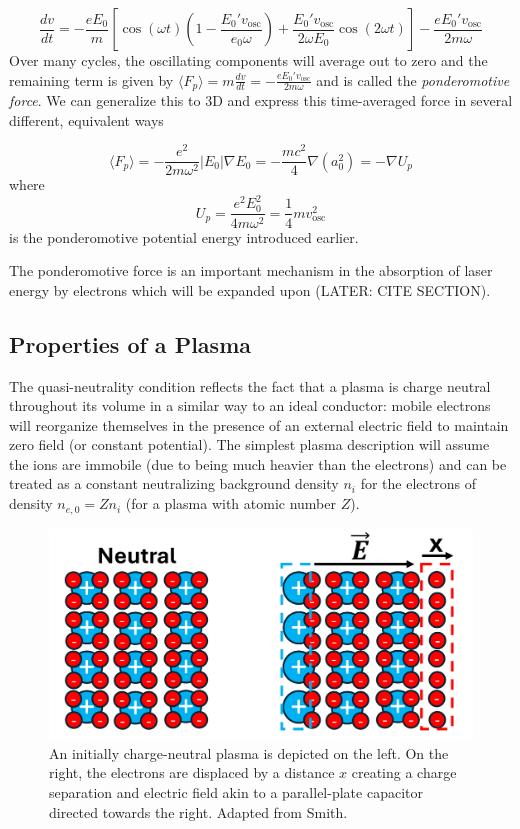 \begin{equation}
	\frac{d v}{d t} = - \frac{e E_0}{m} [\cos(\omega t)(1 - \frac{E_0' v_\text{osc}}{e_0 \omega}) + \frac{E_0' v_\text{osc}}{2 \omega E_0} \cos(2 \omega t)] - \frac{e E_0' v_\text{osc}}{2 m \omega}
\end{equation}
Over many cycles, the oscillating components will average out to zero and the remaining term is given by $\langle F_p \rangle = m \frac{d v}{d t} = - \frac{e E_0' v_\text{osc}}{2 m \omega}$ and is called the \emph{ponderomotive force}. We can generalize this to 3D and express this time-averaged force in several different, equivalent ways

\begin{equation}
	\langle F_p \rangle = - \frac{e^2}{2 m \omega^2} \lvert E_0 \rvert \nabla E_0 = - \frac{m c^2}{4} \nabla(a_0^2) = - \nabla U_p \label{eq:pond_force}
\end{equation}
where 
\begin{equation}
	U_p = \frac{e^2 E_0^2}{4 m \omega^2} = \frac{1}{4} m v_\text{osc}^2 \label{eq:pond_potential}
\end{equation}
is the ponderomotive potential energy introduced earlier. 

The ponderomotive force is an important mechanism in the absorption of laser energy by electrons which will be expanded upon (LATER: CITE SECTION).

\subsection{Properties of a Plasma}
The quasi-neutrality condition reflects the fact that a plasma is charge neutral throughout its volume in a similar way to an ideal conductor: mobile electrons will reorganize themselves in the presence of an external electric field to maintain zero field (or constant  potential). The simplest plasma description will assume the ions are immobile (due to being much heavier than the electrons) and can be treated as a constant neutralizing background density $n_i$ for the electrons of density $n_{e,0} = Z n_i$ (for a plasma with atomic number $Z$).

\begin{figure}
	\centering
	\includegraphics[width=0.75\linewidth]{planning/images/plasma_oscillation.PNG}
	\caption{An initially charge-neutral plasma is depicted on the left. On the right, the electrons are displaced by a distance $x$ creating a charge separation and electric field akin to a parallel-plate capacitor directed towards the right. Adapted from Smith\cite{Smith_2020_Thesis}.}
	\label{fig:plasma_oscillation}
\end{figure}

